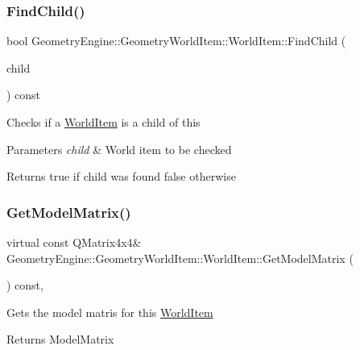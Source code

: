 \subsubsection{\texorpdfstring{FindChild()}{FindChild()}}
{\footnotesize\ttfamily bool Geometry\+Engine\+::\+Geometry\+World\+Item\+::\+World\+Item\+::\+Find\+Child (\begin{DoxyParamCaption}\item[{\mbox{\hyperlink{class_geometry_engine_1_1_geometry_world_item_1_1_world_item}{World\+Item}} $\ast$}]{child }\end{DoxyParamCaption}) const}

Checks if a \mbox{\hyperlink{class_geometry_engine_1_1_geometry_world_item_1_1_world_item}{World\+Item}} is a child of this 
\begin{DoxyParams}{Parameters}
{\em child} & World item to be checked \\
\hline
\end{DoxyParams}
\begin{DoxyReturn}{Returns}
true if child was found false otherwise 
\end{DoxyReturn}
\mbox{\label{class_geometry_engine_1_1_geometry_world_item_1_1_world_item_a341eff00c85bddf6ced93102ddf18408}} 
\subsubsection{\texorpdfstring{GetModelMatrix()}{GetModelMatrix()}}
{\footnotesize\ttfamily virtual const Q\+Matrix4x4\& Geometry\+Engine\+::\+Geometry\+World\+Item\+::\+World\+Item\+::\+Get\+Model\+Matrix (\begin{DoxyParamCaption}{ }\end{DoxyParamCaption}) const\hspace{0.3cm}{\ttfamily [inline]}, {\ttfamily [virtual]}}

Gets the model matris for this \mbox{\hyperlink{class_geometry_engine_1_1_geometry_world_item_1_1_world_item}{World\+Item}} \begin{DoxyReturn}{Returns}
Model\+Matrix 
\end{DoxyReturn}
\mbox{\label{class_geometry_engine_1_1_geometry_world_item_1_1_world_item_a8b4ce24b3f39abee45d37e539ddb52c1}} 
